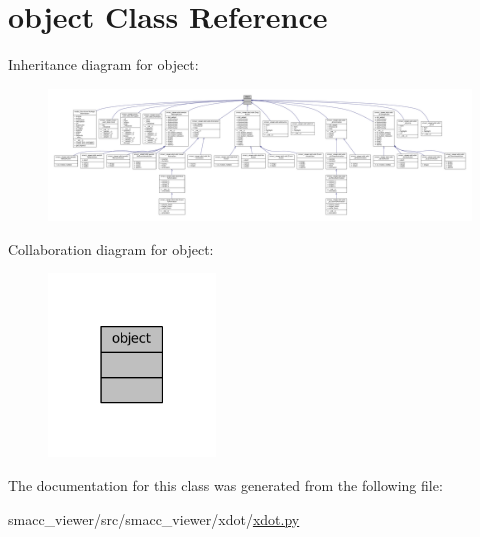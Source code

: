 \hypertarget{classobject}{}\section{object Class Reference}
\label{classobject}


Inheritance diagram for object\+:
\nopagebreak
\begin{figure}[H]
\begin{center}
\leavevmode
\includegraphics[width=350pt]{classobject__inherit__graph}
\end{center}
\end{figure}


Collaboration diagram for object\+:
\nopagebreak
\begin{figure}[H]
\begin{center}
\leavevmode
\includegraphics[width=126pt]{classobject__coll__graph}
\end{center}
\end{figure}


The documentation for this class was generated from the following file\+:\begin{DoxyCompactItemize}
\item 
smacc\+\_\+viewer/src/smacc\+\_\+viewer/xdot/\hyperlink{xdot_8py}{xdot.\+py}\end{DoxyCompactItemize}

